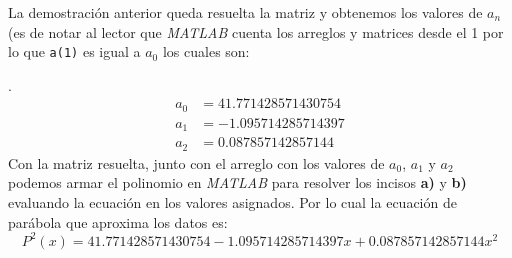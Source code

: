\documentclass[11pt,letterpaper]{article}
\begin{document}
La demostración anterior queda resuelta la matriz y obtenemos los valores de $a_n$ (es de notar al lector que \textit{MATLAB} cuenta los arreglos y matrices desde el 1 por lo que \texttt{a(1)} es igual a $a_0$ los cuales son: \par. 
\begin{align}
a_0 &= 41.771428571430754 \\
a_1 &= -1.095714285714397 \\
a_2 &= 0.087857142857144 \label{equation:aParab}
\end{align}
Con la matriz resuelta, junto con el arreglo con los valores de $a_0$, $a_1$ y $a_2$ podemos armar el polinomio en \textit{MATLAB} para resolver los incisos \textbf{a)} y \textbf{b)} evaluando la ecuación en los valores asignados. Por lo cual la ecuación de parábola que aproxima los datos es: 
$$P^2(x) =  41.771428571430754  - 1.095714285714397x + 0.087857142857144x^2$$ 
\end{document}
